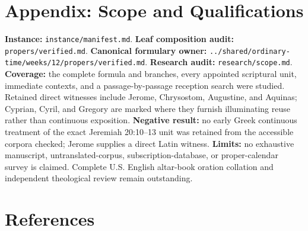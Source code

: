 \section*{Appendix: Scope and Qualifications}

\begin{studyframe}
\textbf{Instance:} \nolinkurl{instance/manifest.md}. \textbf{Leaf composition audit:} \nolinkurl{propers/verified.md}. \textbf{Canonical formulary owner:} \nolinkurl{../shared/ordinary-time/weeks/12/propers/verified.md}. \textbf{Research audit:} \nolinkurl{research/scope.md}. \textbf{Coverage:} the complete formula and branches, every appointed scriptural unit, immediate contexts, and a passage-by-passage reception search were studied. Retained direct witnesses include Jerome, Chrysostom, Augustine, and Aquinas; Cyprian, Cyril, and Gregory are marked where they furnish illuminating reuse rather than continuous exposition. \textbf{Negative result:} no early Greek continuous treatment of the exact Jeremiah 20:10--13 unit was retained from the accessible corpora checked; Jerome supplies a direct Latin witness. \textbf{Limits:} no exhaustive manuscript, untranslated-corpus, subscription-database, or proper-calendar survey is claimed. Complete U.S. English altar-book oration collation and independent theological review remain outstanding.
\end{studyframe}

\section*{References}

